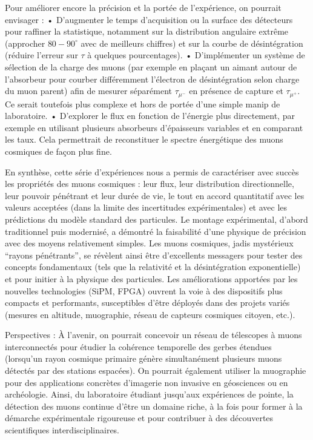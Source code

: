 \documentclass[a4paper,12pt,twoside]{article}
\begin{document}
Pour améliorer encore la précision et la portée de l’expérience, on pourrait envisager :
	•	D’augmenter le temps d’acquisition ou la surface des détecteurs pour raffiner la statistique, notamment sur la distribution angulaire extrême (approcher $80-90^\circ$ avec de meilleurs chiffres) et sur la courbe de désintégration (réduire l’erreur sur $\tau$ à quelques pourcentages).
	•	D’implémenter un système de sélection de la charge des muons (par exemple en plaçant un aimant autour de l’absorbeur pour courber différemment l’électron de désintégration selon charge du muon parent) afin de mesurer séparément $\tau_{\mu^-}$ en présence de capture et $\tau_{\mu^+}$. Ce serait toutefois plus complexe et hors de portée d’une simple manip de laboratoire.
	•	D’explorer le flux en fonction de l’énergie plus directement, par exemple en utilisant plusieurs absorbeurs d’épaisseurs variables et en comparant les taux. Cela permettrait de reconstituer le spectre énergétique des muons cosmiques de façon plus fine.

En synthèse, cette série d’expériences nous a permis de caractériser avec succès les propriétés des muons cosmiques : leur flux, leur distribution directionnelle, leur pouvoir pénétrant et leur durée de vie, le tout en accord quantitatif avec les valeurs acceptées (dans la limite des incertitudes expérimentales) et avec les prédictions du modèle standard des particules. Le montage expérimental, d’abord traditionnel puis modernisé, a démontré la faisabilité d’une physique de précision avec des moyens relativement simples. Les muons cosmiques, jadis mystérieux “rayons pénétrants”, se révèlent ainsi être d’excellents messagers pour tester des concepts fondamentaux (tels que la relativité et la désintégration exponentielle) et pour initier à la physique des particules. Les améliorations apportées par les nouvelles technologies (SiPM, FPGA) ouvrent la voie à des dispositifs plus compacts et performants, susceptibles d’être déployés dans des projets variés (mesures en altitude, muographie, réseau de capteurs cosmiques citoyen, etc.).

Perspectives : À l’avenir, on pourrait concevoir un réseau de télescopes à muons interconnectés pour étudier la cohérence temporelle des gerbes étendues (lorsqu’un rayon cosmique primaire génère simultanément plusieurs muons détectés par des stations espacées). On pourrait également utiliser la muographie pour des applications concrètes d’imagerie non invasive en géosciences ou en archéologie. Ainsi, du laboratoire étudiant jusqu’aux expériences de pointe, la détection des muons continue d’être un domaine riche, à la fois pour former à la démarche expérimentale rigoureuse et pour contribuer à des découvertes scientifiques interdisciplinaires.
\end{document}
